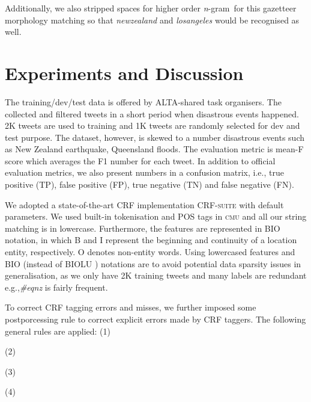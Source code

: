 \documentclass[11pt]{article}
\newcommand{\eg}{e.g.,\xspace}
\newcommand{\ie}{i.e.,\xspace}
\newcommand{\myex}[1]{\textit{#1}}
\newcommand{\method}[1]{\textsf{#1}\xspace}
\newcommand{\ngram}{\textit{n}-gram\ }
\newcommand{\cmu}{\textsc{cmu}\xspace}
\newcommand{\crfsuite}{\textsc{CRF-suite}\xspace}
\begin{document}
Additionally, we also stripped spaces for higher order \ngram for this gazetteer morphology matching so that \myex{newzealand} and \myex{losangeles} would be recognised as well.

\section{Experiments and Discussion}
\label{sec:experiment}

The training/dev/test data is offered by ALTA-shared task organisers.
The collected and filtered tweets in a short period when disastrous events happened.
2K tweets are used to training and 1K tweets are randomly selected for dev and test purpose.
The dataset, however, is skewed to a number disastrous events such as New Zealand earthquake, Queensland floods.
The evaluation metric is mean-F score which averages the F1 number for each tweet.
In addition to official evaluation metrics, we also present numbers in a confusion matrix, \ie true positive (TP), false positive (FP), true negative (TN) and false negative (FN).

We adopted a state-of-the-art CRF implementation \crfsuite \cite{} with default parameters.
We used built-in tokenisation and POS tags in \cmu and all our string matching is in lowercase.
Furthermore, the features are represented in \method{BIO} notation, in which \method{B} and \method{I} represent the beginning and continuity of a location entity, respectively.
\method{O} denotes non-entity words.
Using lowercased features and \method{BIO} (instead of \method{BIOLU} \cite{conll09rati}) notations are to avoid potential data sparsity issues in generalisation, as we only have 2K training tweets and many labels are redundant \eg \myex{\#eqnz} is fairly frequent.

To correct CRF tagging errors and misses, we further imposed some postporcessing rule to correct explicit errors made by CRF taggers.
The following general rules are applied:
(1) 

(2) 

(3) 

(4) 
\end{document}
